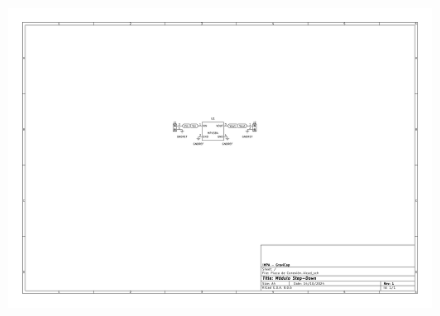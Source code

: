 \begin{landscape}
        \newpage

        \begin{figure}
            \centering
            \includegraphics[angle=270, width=\textwidth,height=\textheight,keepaspectratio]{Imagenes/Anexo_A/Esquemático - Placa_de_Conexion.pdf}
            \label{fig:A_3}
        \end{figure}
        
    \end{landscape}
